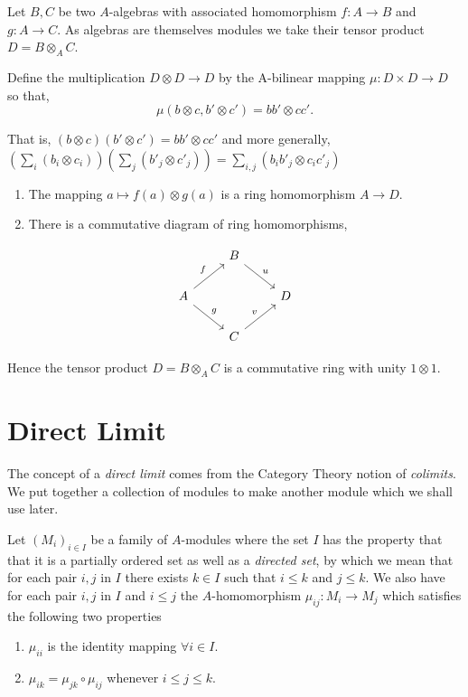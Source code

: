 \documentclass[]{report}
\begin{document}
Let $B,C$ be two $A$-algebras with associated homomorphism $f:A\rightarrow B$ and $g:A\rightarrow C$. As algebras are themselves modules we take their tensor product $D = B\otimes_A C$. 

Define the multiplication $D\otimes D \rightarrow D$ by the A-bilinear mapping $\mu: D\times D \rightarrow D$ so that,
$$\mu(b\otimes c, b'\otimes c') = bb' \otimes cc'. $$


That is, $(b\otimes c)(b'\otimes c') = bb'\otimes cc'$ and more generally, $(\sum_i(b_i\otimes c_i))(\sum_j(b'_j\otimes c'_j)) = \sum_{i,j}(b_i b'_j \otimes c_i c'_j)$
\begin{enumerate}
    \item The mapping $a\mapsto f(a)\otimes g(a)$ is a ring homomorphism $A\rightarrow D$. 
    \item There is a commutative diagram of ring homomorphisms, 
\end{enumerate}

\begin{equation*}
    \begin{tikzcd}
                                  & B \arrow[rd, "u"] &   \\
        A \arrow[ru, "f"] \arrow[rd, "g"] &                   & D \\
                                  & C \arrow[ru, "v"] &  
    \end{tikzcd}
\end{equation*}

Hence the tensor product $D = B \otimes_A C$ is a commutative ring with unity $1 \otimes 1$.

\section{Direct Limit}

The concept of a \textit{direct limit} comes from the Category Theory notion of \textit{colimits}. We put together a collection of modules to make another module which we shall use later.

Let $(M_i)_{i\in I}$ be a family of $A$-modules where the set $I$ has the property that that it is a partially ordered set as well as a \textit{directed set}, by which we mean that for each pair $i,j$ in $I$ there exists $k\in I$ such that $i\leq k$ and $j\leq k$. We also have for each pair $i,j$ in $I$ and $i\leq j$ the $A$-homomorphism $\mu_{ij}: M_i \rightarrow M_j$ which satisfies the following two properties
\begin{enumerate}
    \item $\mu_{ii}$ is the identity mapping $\forall i\in I$.
    \item $\mu_{ik} = \mu_{jk}\circ \mu_{ij}$ whenever $i\leq j\leq k$.
\end{enumerate}
\end{document}
